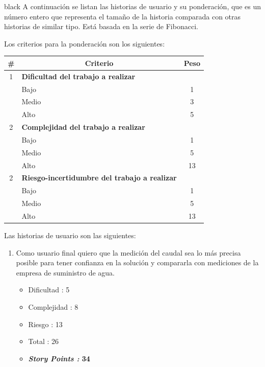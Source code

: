 \documentclass[
11pt, %
codirector, %
]{charter}
\begin{document}
\begin{consigna}{black}
A continuación se listan las historias de usuario y su ponderación, que es un número entero que representa el tamaño de la historia comparada con otras historias de similar tipo. Está basada en la serie de Fibonacci.

Los criterios para la ponderación son los siguientes:

\begin{table}[ht]
\label{tab:haUsuarioPesos}
\centering
\begin{tabularx}{\linewidth}{@{}|c|X|c|@{}}
\hline
\rowcolor[HTML]{C0C0C0} 
\# & \multicolumn{1}{c|}{\cellcolor[HTML]{C0C0C0}Criterio} 	& Peso      \\ \hline
1      & \textbf{Dificultad del trabajo a realizar}          	&  \\ \hline 
      	& Bajo                 								&  1 \\ \hline
       	& Medio                								&  3 \\ \hline
      	& Alto                 								&  5 \\ \hline
2      & \textbf{Complejidad del trabajo a realizar}        	&  \\ \hline 
      	& Bajo                 								&  1 \\ \hline
       	& Medio                								&  5 \\ \hline
      	& Alto                 								& 13 \\ \hline
2      & \textbf{Riesgo-incertidumbre del trabajo a realizar}        	&  \\ \hline 
      	& Bajo                 								&  1 \\ \hline
       	& Medio                								&  5 \\ \hline
      	& Alto                 								& 13 \\ \hline

\end{tabularx}
\end{table}

\pagebreak 
Las historias de usuario son las siguientes:

\begin{enumerate}
\item Como usuario final quiero que la medición del caudal sea lo más precisa posible para tener confianza en la solución y compararla con mediciones de la empresa de suministro de agua.
	\begin{itemize}
		\item Dificultad	:  5
		\item Complejidad	:  8
		\item Riesgo		: 13
		\item Total			: 26
		\item \textbf{\textit{Story Points	:} 34} 		
	\end{itemize}


\end{enumerate}
\end{consigna}
\end{document}
